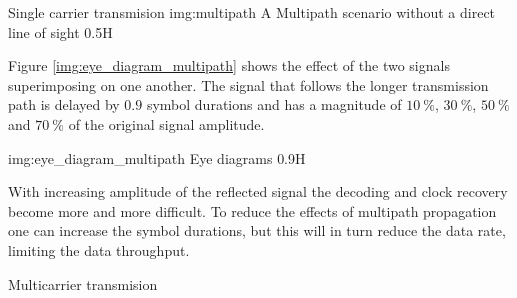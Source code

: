 \begin{subchapter}{Single carrier transmision}
               {img:multipath}
               {A Multipath scenario without a direct line of sight}
               {0.5}{H}

  Figure \ref{img:eye_diagram_multipath} shows the effect of the
  two signals superimposing on one another.
  The signal that follows the longer transmission path
  is delayed by $0.9$ symbol durations and has a magnitude
  of $\SI{10}{\percent}$, $\SI{30}{\percent}$, $\SI{50}{\percent}$ and
  $\SI{70}{\percent}$ of the original signal amplitude.

               {img:eye_diagram_multipath}
               {Eye diagrams}
               {0.9}{H}

  With increasing amplitude of the reflected signal the decoding
  and clock recovery become more and more difficult.
  To reduce the effects of multipath propagation one can
  increase the symbol durations, but this will in turn
  reduce the data rate, limiting the data throughput.

\end{subchapter}

\begin{subchapter}{Multicarrier transmision}

\end{subchapter}
